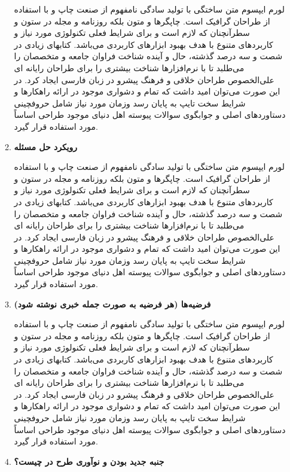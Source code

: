 \documentclass[letterpaper,11pt]{article}
\begin{document}
\begin{enumerate}
\begin{enumerate}
\begin{mdframed}
لورم ایپسوم متن ساختگی با تولید سادگی نامفهوم از صنعت چاپ و با استفاده از طراحان گرافیک است. چاپگرها و متون بلکه روزنامه و مجله در ستون و سطرآنچنان که لازم است و برای شرایط فعلی تکنولوژی مورد نیاز و کاربردهای متنوع با هدف بهبود ابزارهای کاربردی می‌باشد. کتابهای زیادی در شصت و سه درصد گذشته، حال و آینده شناخت فراوان جامعه و متخصصان را می‌طلبد تا با نرم‌افزارها شناخت بیشتری را برای طراحان رایانه ای علی‌الخصوص طراحان خلاقی و فرهنگ پیشرو در زبان فارسی ایجاد کرد. در این صورت می‌توان امید داشت که تمام و دشواری موجود در ارائه راهکارها و شرایط سخت تایپ به پایان رسد وزمان مورد نیاز شامل حروفچینی دستاوردهای اصلی و جوابگوی سوالات پیوسته اهل دنیای موجود طراحی اساساً مورد استفاده قرار گیرد.
\end{mdframed}
  \item \textbf{رویکرد حل مسئله}
\begin{mdframed}
لورم ایپسوم متن ساختگی با تولید سادگی نامفهوم از صنعت چاپ و با استفاده از طراحان گرافیک است. چاپگرها و متون بلکه روزنامه و مجله در ستون و سطرآنچنان که لازم است و برای شرایط فعلی تکنولوژی مورد نیاز و کاربردهای متنوع با هدف بهبود ابزارهای کاربردی می‌باشد. کتابهای زیادی در شصت و سه درصد گذشته، حال و آینده شناخت فراوان جامعه و متخصصان را می‌طلبد تا با نرم‌افزارها شناخت بیشتری را برای طراحان رایانه ای علی‌الخصوص طراحان خلاقی و فرهنگ پیشرو در زبان فارسی ایجاد کرد. در این صورت می‌توان امید داشت که تمام و دشواری موجود در ارائه راهکارها و شرایط سخت تایپ به پایان رسد وزمان مورد نیاز شامل حروفچینی دستاوردهای اصلی و جوابگوی سوالات پیوسته اهل دنیای موجود طراحی اساساً مورد استفاده قرار گیرد.
\end{mdframed}
  \item \textbf{فرضیه‌ها (هر فرضیه به صورت جمله خبری نوشته شود)}
\begin{mdframed}
لورم ایپسوم متن ساختگی با تولید سادگی نامفهوم از صنعت چاپ و با استفاده از طراحان گرافیک است. چاپگرها و متون بلکه روزنامه و مجله در ستون و سطرآنچنان که لازم است و برای شرایط فعلی تکنولوژی مورد نیاز و کاربردهای متنوع با هدف بهبود ابزارهای کاربردی می‌باشد. کتابهای زیادی در شصت و سه درصد گذشته، حال و آینده شناخت فراوان جامعه و متخصصان را می‌طلبد تا با نرم‌افزارها شناخت بیشتری را برای طراحان رایانه ای علی‌الخصوص طراحان خلاقی و فرهنگ پیشرو در زبان فارسی ایجاد کرد. در این صورت می‌توان امید داشت که تمام و دشواری موجود در ارائه راهکارها و شرایط سخت تایپ به پایان رسد وزمان مورد نیاز شامل حروفچینی دستاوردهای اصلی و جوابگوی سوالات پیوسته اهل دنیای موجود طراحی اساساً مورد استفاده قرار گیرد.
\end{mdframed}
  \item \textbf{جنبه جدید بودن و نوآوری طرح در چیست؟} \newline

\end{enumerate}
\end{enumerate}
\end{document}
